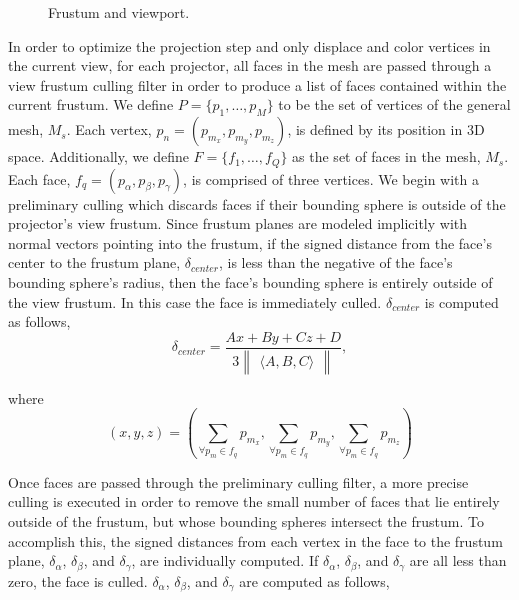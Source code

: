 \documentclass[twocolumn]{article}
\begin{document}
\begin{figure}[!h]
   \vspace{-0.2cm}
   \caption{Frustum and viewport.}
  \label{fig:frustum}
 \end{figure}

In order to optimize the projection step and only displace and color vertices in the current view, for each projector, all faces in the mesh are passed through a view frustum culling filter in order to produce a list of faces contained within the current frustum. We define $P = \{p_{1},\dots,p_{M}\}$ to be the set of vertices of the general mesh, $M_s$. Each vertex, $p_{n} =  (p_{m_{x}},p_{m_{y}},p_{m_{z}})$, is defined by its position in 3D space. Additionally, we define $F = \{f_{1},\dots,f_{Q}\}$ as the set of faces in the mesh, $M_s$. Each face, $f_{q} = (p_{\alpha}, p_{\beta}, p_{\gamma})$, is comprised of three vertices. We begin with a preliminary culling which discards faces if their bounding sphere is outside of the projector's view frustum. Since frustum planes are modeled implicitly with normal vectors pointing into the frustum, if the signed distance from the face's center to the frustum plane, $\delta_{center}$, is less than the negative of the face's bounding sphere's radius, then the face's bounding sphere is entirely outside of the view frustum. In this case the face is immediately culled. $\delta_{center}$ is computed as follows,
%
\begin{equation}
\delta_{center} = \frac{Ax + By + Cz + D}{3 \begin{Vmatrix} \langle A, B, C \rangle \end{Vmatrix}},
\end{equation}

where
\begin{equation}
(x, y, z) = \left(\sum\limits_{\forall p_{m} \in f_{q}} p_{m_{x}}, \sum\limits_{\forall p_{m} \in f_{q}} p_{m_{y}}, \sum\limits_{\forall p_{m} \in f_{q}} p_{m_{z}}\right)
\end{equation}

Once faces are passed through the preliminary culling filter, a more precise culling is executed in order to remove the small number of faces that lie entirely outside of the frustum, but whose bounding spheres intersect the frustum.  To accomplish this, the signed distances from each vertex in the face to the frustum plane, $\delta_{\alpha}$, $\delta_{\beta}$, and $\delta_{\gamma}$, are individually computed. If $\delta_{\alpha}$, $\delta_{\beta}$, and $\delta_{\gamma}$ are all less than zero, the face is culled. $\delta_{\alpha}$, $\delta_{\beta}$, and $\delta_{\gamma}$ are computed as follows,
\end{document}
